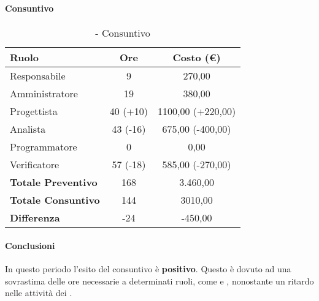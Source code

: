 \documentclass[./PianoDiProgetto.tex]{subfiles}
\begin{document}
\subsubsection{\PerPD}
\paragraph{Consuntivo}
		\begin{table}[h]
		\centering
		\begin{tabular}{l * {2}{c}}
			\toprule
			\textbf{Ruolo} & \textbf{Ore} & \textbf{Costo (\euro{})} \\
			\midrule
			Responsabile &	9 & 270,00 \\
			Amministratore & 19 & 380,00\\
			Progettista & 40 (+10) & 1100,00 (+220,00) \\
			Analista & 43 (-16) & 675,00 (-400,00) \\
			Programmatore & 0 & 0,00 \\
			Verificatore & 57 (-18) & 585,00 (-270,00) \\
			\midrule
			\textbf{Totale Preventivo} & 168
 & 3.460,00
 \\		
			\textbf{Totale Consuntivo} & 144 & 3010,00
 \\
			\midrule
			\textbf{Differenza} & -24 & -450,00 \\
			\bottomrule
		\end{tabular}
		\caption{\PerPD{} - Consuntivo}
		
	\end{table}	
	\paragraph{Conclusioni}
	In questo periodo l'esito del consuntivo è \textbf{positivo}. Questo è dovuto ad una sovrastima delle ore necessarie a determinati ruoli, come \AN{} e \VER{}, nonostante un ritardo nelle attività dei \PJP{}.
	
	\clearpage
\end{document}
